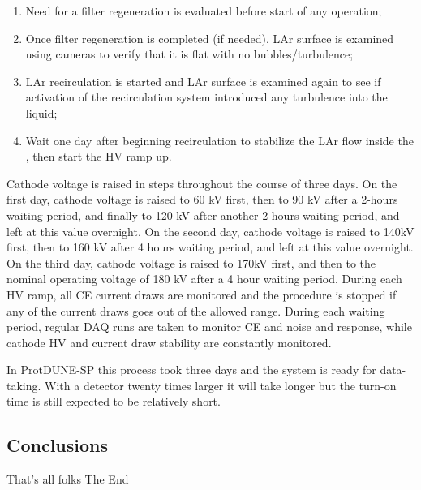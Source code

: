 \begin{enumerate}

    \item Need for a filter regeneration is evaluated before start of any operation;

    \item Once filter regeneration is completed (if needed), LAr surface is examined using cameras to verify that it is flat with no bubbles/turbulence;
    
    \item LAr recirculation is started and LAr surface is examined again to see if activation of the recirculation system introduced any turbulence into the liquid;
    
    \item Wait one day after beginning  recirculation to stabilize the LAr flow inside the , then start the HV ramp up.
    
\end{enumerate}

Cathode voltage is raised in steps throughout the course of three days. 
On the first day, cathode voltage is raised to 60 kV first, then to 90 kV after a 2-hours waiting period, and finally to 120 kV after another 2-hours waiting period, and left at this value overnight.
On the second day, cathode voltage is raised to 140kV first, then to 160 kV after 4 hours waiting period, and left at this value overnight.
On the third day, cathode voltage is raised to 170kV first, and then to the nominal operating voltage of 180 kV after a 4 hour waiting period.
During each HV ramp, all CE current draws are monitored and the procedure is stopped if any of the current draws goes out of the allowed range.
During each waiting period, regular DAQ runs are taken to monitor CE and  noise and response, while cathode HV and current draw stability are constantly monitored.

In ProtDUNE-SP this process took three days and the system is ready for data-taking. With a detector twenty times larger it will take longer but the turn-on time is still expected to be relatively short. 

\subsection{Conclusions}
\label{sec:fdsp-tc-inst-concl}

That's all folks
The End
